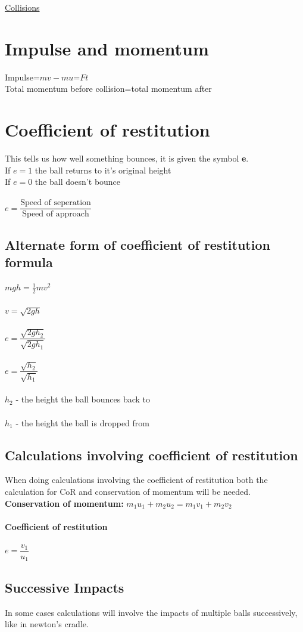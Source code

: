 \documentclass{article}[18pt]
\begin{document}
\begin{center}
\underline{\huge Collisions}
\end{center}
\section{Impulse and momentum}
Impulse=$mv-mu$=$Ft$\\
Total momentum before collision=total momentum after
\section{Coefficient of restitution}
This tells us how well something bounces, it is given the symbol \textbf{e}.\\
If $e=1$ the ball returns to it's original height\\
If $e=0$ the ball doesn't bounce\\
\\
$e=\dfrac{\text{Speed of seperation}}{\text{Speed of approach}}$
\subsection{Alternate form of coefficient of restitution formula}
$mgh=\frac{1}{2}mv^2$\\
\\
$v=\sqrt{2gh}$\\
\\
$e=\dfrac{\sqrt{2gh_2}}{\sqrt{2gh_1}}$\\
\\
$e=\dfrac{\sqrt{h_2}}{\sqrt{h_1}}$\\
\\
$h_2$ - the height the ball bounces back to\\
\\
$h_1$ - the height the ball is dropped from
\subsection{Calculations involving coefficient of restitution}
When doing calculations involving the coefficient of restitution both the calculation for CoR and conservation of momentum will be needed.\\
\textbf{Conservation of momentum:}
$m_1u_1+m_2u_2=m_1v_1+m_2v_2$\\
\\
\textbf{Coefficient of restitution}\\
\\
$e=\dfrac{v_1}{u_1}$
\subsection{Successive Impacts}
In some cases calculations will involve the impacts of multiple balls successively, like in newton's cradle.
\end{document}
